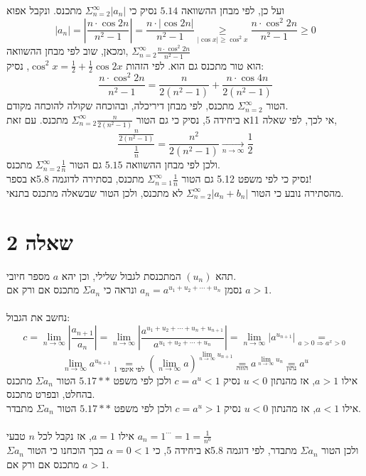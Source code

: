 \documentclass{article}
\newcommand\underrel[2]{\mathrel{\mathop{#2}\limits_{#1}}}
\begin{document}
ועל כן, לפי מבחן ההשוואה $5.14$
נסיק כי $\Sigma_{n=2}^\infty |a_n|$ מתכנס.
ונקבל אפוא
\[
    |a_n|=\left|\frac{n\cdot \cos 2n}{n^2-1}\right| =
    \frac{n\cdot |\cos 2n|}{n^2-1}\underrel{|\cos x| \geq \cos^2x}{\geq}
    \frac{n\cdot \cos^2 2n}{n^2-1}\geq 0
\]
ומכאן, שוב לפי מבחן ההשוואה, $\Sigma_{n=2}^\infty \frac{n\cdot \cos^2 2n}{n^2-1}$ \\
הוא טור מתכנס גם הוא. לפי הזהות $\cos^2 x = \frac{1}{2} + \frac{1}{2}\cos 2x$, נסיק:
\[
    \frac{n\cdot \cos^2 2n}{n^2-1} =
    \frac{n}{2(n^2-1)} + \frac{n\cdot \cos 4n}{2(n^2-1)}
\]
הטור $\Sigma_{n=2}^\infty$ מתכנס, לפי מבחן דיריכלה, ובהוכחה שקולה להוכחה מקודם. \\
אי לכך, לפי שאלה 11א ביחידה 5, נסיק כי
גם הטור $\Sigma_{n=2}^\infty \frac{n}{2(n^2-1)}$ מתכנס.
עם זאת,
\[
    \frac{\frac{n}{2(n^2-1)}}{\frac{1}{n}} =
    \frac{n^2}{2(n^2-1)}\xrightarrow[n\rightarrow \infty ]{} \frac{1}{2}
\]
ולכן לפי מבחן ההשוואה $5.15$ גם הטור $\Sigma_{n=2}^\infty \frac{1}{n}$ מתכנס. \\
נסיק כי לפי משפט 5.12 גם הטור $\Sigma_{n=1}^\infty \frac{1}{n}$ מתכנס, בסתירה לדוגמה 5.8א בספר!
\\
מהסתירה נובע כי הטור $\Sigma_{n=2}^\infty |a_n+b_n|$ לא מתכנס, ולכן הטור שבשאלה מתכנס בתנאי.

\pagebreak

\section*{שאלה 2}

תהא $(u_n)$ המתכנסת לגבול שלילי, וכן יהא $a$ מספר חיובי. \\
נסמן $a_n=a^{u_1+u_2+\cdots +u_n}$ ונראה כי $\Sigma a_n$ מתכנס אם ורק אם $a>1$.
\\\\
נחשב את הגבול:
\[
    c=\lim_{n\rightarrow \infty} \left| \frac{a_{n+1}}{a_n} \right| =
    \lim_{n\rightarrow \infty} \left| \frac{a^{u_1+u_2+\cdots +u_n+u_{n+1}}}{a^{u_1+u_2+\cdots +u_n}} \right| =
    \lim_{n\rightarrow \infty} |a^{u_{n+1}}|\underrel{a>0\Rightarrow a^x>0}{=}
\]
\[
    \lim_{n\rightarrow \infty} a^{u_{n+1}}\underrel{\text{לפי אינפי 1}}{=}
    (\lim_{n\rightarrow \infty} a)^{\lim_{n\rightarrow \infty}{u_{n+1}}}\underrel{\text{הזזה}}{=}
    a^{{\lim_{n\rightarrow \infty}{u_{n}}}}\underrel{\text{נתון}}{=}
    a^u
\]
אילו $a > 1$,
אז מהנתון $u<0$ נסיק $c=a^u<1$ ולכן לפי משפט $5.17**$ הטור $\Sigma a_n$ מתכנס בהחלט, ובפרט מתכנס.\\
אילו $a<1$,
אז מהנתון $u<0$ נסיק $c=a^u>1$ ולכן לפי משפט $5.17**$ הטור $\Sigma a_n$ מתבדר.
\\\\
אילו $a=1$, אז נקבל לכל $n$ טבעי $a_n=1^{\cdots}=1=\frac{1}{n^0}$\\
ולכן הטור $\Sigma a_n$ מתבדר, לפי דוגמה 5.8א ביחידה 5, כי $\alpha = 0 < 1$
בכך הוכחנו כי הטור $\Sigma a_n$ מתכנס אם ורק אם $a > 1$.
\end{document}

